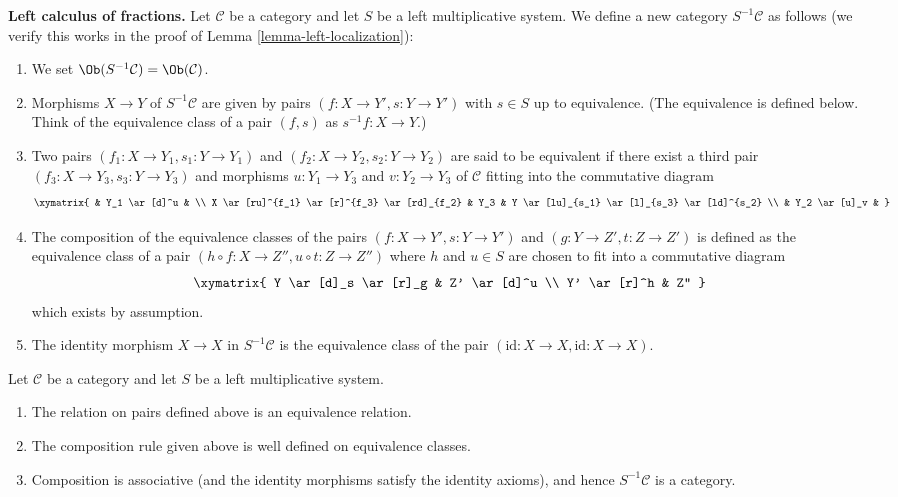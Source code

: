\medskip\noindent
{\bf Left calculus of fractions.}
Let $\mathcal{C}$ be a category and let $S$ be a left multiplicative
system. We define a new category $S^{-1}\mathcal{C}$ as follows
(we verify this works in the proof of
Lemma \ref{lemma-left-localization}):
\begin{enumerate}
\item We set $\Ob(S^{-1}\mathcal{C}) = \Ob(\mathcal{C})$.
\item Morphisms $X \to Y$ of $S^{-1}\mathcal{C}$ are given by pairs
$(f : X \to Y', s : Y \to Y')$ with $s \in S$ up to equivalence.
(The equivalence is defined below. Think of the equivalence class
of a pair $(f, s)$ as $s^{-1}f : X \to Y$.)
\item Two pairs $(f_1 : X \to Y_1, s_1 : Y \to Y_1)$ and
$(f_2 : X \to Y_2, s_2 : Y \to Y_2)$ are said to be equivalent
if there exist a third pair $(f_3 : X \to Y_3, s_3 : Y \to Y_3)$
and morphisms $u : Y_1 \to Y_3$ and $v : Y_2 \to Y_3$ of $\mathcal{C}$
fitting into the commutative diagram
$$
\xymatrix{
 & Y_1 \ar[d]^u & \\
X \ar[ru]^{f_1} \ar[r]^{f_3} \ar[rd]_{f_2} &
Y_3 &
Y \ar[lu]_{s_1} \ar[l]_{s_3} \ar[ld]^{s_2} \\
& Y_2 \ar[u]_v &
}
$$
\item The composition of the equivalence classes of the pairs
$(f : X \to Y', s : Y \to Y')$ and $(g : Y \to Z', t : Z \to Z')$
is defined as the equivalence class of a pair
$(h \circ f : X \to Z'', u \circ t : Z \to Z'')$
where $h$ and $u \in S$ are chosen to fit into a commutative diagram
$$
\xymatrix{
Y \ar[d]_s \ar[r]_g & Z' \ar[d]^u \\
Y' \ar[r]^h & Z''
}
$$
which exists by assumption.
\item The identity morphism $X \to X$ in $S^{-1} \mathcal{C}$ is the
equivalence class of the pair $(\text{id} : X \to X,
\text{id} : X \to X)$.
\end{enumerate}

\begin{lemma}
\label{lemma-left-localization}
Let $\mathcal{C}$ be a category and let $S$ be a left multiplicative
system.
\begin{enumerate}
\item The relation on pairs defined above is an equivalence relation.
\item The composition rule given above is well defined on equivalence
classes.
\item Composition is associative (and the identity morphisms satisfy
the identity axioms), and hence $S^{-1}\mathcal{C}$ is a category.
\end{enumerate}
\end{lemma}

